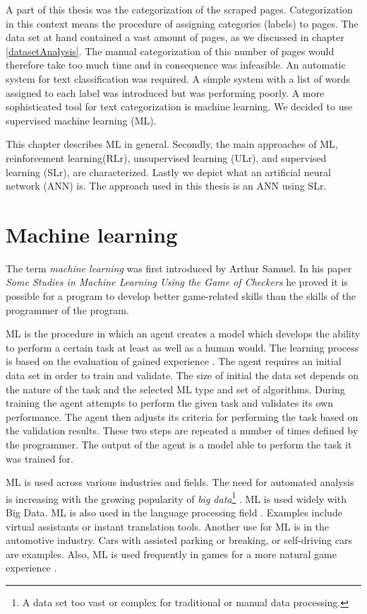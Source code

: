 \label{machineLearning}
A part of this thesis was the categorization of the scraped pages. Categorization in this context means the procedure of assigning categories (labels) to pages. The data set at hand contained a vast amount of pages, as we discussed in chapter \ref{datasetAnalysis}. The manual categorization of this number of pages would therefore take too much time and in consequence was infeasible. An automatic system for text classification was required. A simple system with a list of words assigned to each label was introduced but was performing poorly. A more sophisticated tool for text categorization is machine learning. We decided to use supervised machine learning (ML).

This chapter describes ML in general. Secondly, the main approaches of ML, reinforcement learning(RLr), unsupervised learning (ULr), and supervised learning (SLr), are characterized. Lastly we depict what an artificial neural network (ANN) is. The approach used in this thesis is an ANN using SLr.
 
\section{Machine learning} \label{machineLearning}
The term \textit{machine learning} was first introduced by Arthur Samuel. In his paper \textit{Some Studies in Machine Learning Using the Game of Checkers} \cite{machineLearningOriginal} he proved it is possible for a program to develop better game-related skills than the skills of the programmer of the program.

ML is the procedure in which an agent creates a model which develops the ability to perform a certain task at least as well as a human would. The learning process is based on the evaluation of gained experience \cite{machineLearningToday}. The agent requires an initial data set in order to train and validate. The size of initial the data set depends on the nature of the task and the selected ML type and set of algorithms. During training the agent attempts to perform the given task and validates its own performance. The agent then adjusts its criteria for performing the task based on the validation results. These two steps are repeated a number of times defined by the programmer. The output of the agent is a model able to perform the task it was trained for. 

ML is used across various industries and fields. The need for automated analysis is increasing with the growing popularity of \textit{big data}\footnote{A data set too vast or complex for traditional or manual data processing.} \cite{bigDataExplained} \cite{bigDataPopularity}. ML is used widely with Big Data. ML is also used in the language processing field \cite{machineLearningToday}. Examples include virtual assistants or instant translation tools. Another use for ML is in the automotive industry. Cars with assisted parking or breaking, or self-driving cars are examples\cite{selfDrivingCars}. Also, ML is used frequently in games for a more natural game experience \cite{machineLearningGaming}. 

